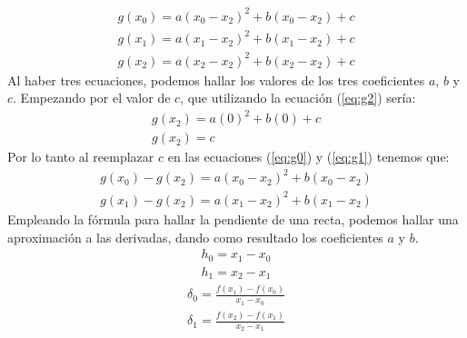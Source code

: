 \documentclass[ceqn,10pt]{SelfArx}
\begin{document}
\begin{equation} \label{eq:g0}
\begin{aligned}
	g(x_{0})=a(x_{0}-x_{2})^2+b(x_{0}-x_{2})+c
\end{aligned}
\end{equation}
\begin{equation} \label{eq:g1}
\begin{aligned}
	g(x_{1})=a(x_{1}-x_{2})^2+b(x_{1}-x_{2})+c
\end{aligned}
\end{equation}
\begin{equation} \label{eq:g2}
\begin{aligned}
	g(x_{2})=a(x_{2}-x_{2})^2+b(x_{2}-x_{2})+c
\end{aligned}
\end{equation}
Al haber tres ecuaciones, podemos hallar los valores de los tres coeficientes $a$, $b$ y $c$.
Empezando por el valor de $c$, que utilizando la ecuación (\ref*{eq:g2}) sería:
\begin{equation} \label{eq:g2S}
	\begin{aligned}
	g(x_{2})=a(0)^2+b(0)+c\\
	g(x_{2})=c
\end{aligned}
\end{equation}
Por lo tanto al reemplazar $c$ en las ecuaciones (\ref*{eq:g0}) y (\ref*{eq:g1}) tenemos que:
\begin{equation} \label{eq:despejeg0}
	\begin{aligned}
	g(x_{0})-g(x_{2})=a(x_{0}-x_{2})^2+b(x_{0}-x_{2})
\end{aligned}
\end{equation}
\begin{equation} \label{eq:despejeg1}
	\begin{aligned}
	g(x_{1})-g(x_{2})=a(x_{1}-x_{2})^2+b(x_{1}-x_{2})
\end{aligned}
\end{equation}
Empleando la fórmula para hallar la pendiente de una recta, podemos hallar una aproximación a las derivadas, dando como resultado
los coeficientes $a$ y $b$.
\begin{equation} \label{eq:ecuacionesPendiente}
	\begin{aligned}
	h_{0}=x_{1}-x_{0}\\
	h_{1}=x_{2}-x_{1}
\end{aligned}
\end{equation}
\begin{equation} \label{eq:deltas}
	\begin{aligned}
	\delta_{0}= \frac{f(x_{1})-f(x_{0})}{x_{1}-x_{0}}\\
	\delta_{1}= \frac{f(x_{2})-f(x_{1})}{x_{2}-x_{1}}
\end{aligned}
\end{equation}
\end{document}
